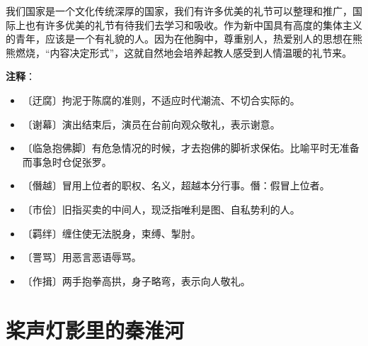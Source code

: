 \documentclass[12pt,UTF-8,openany]{ctexbook}
\begin{document}
\begin{normalsize}
    我们国家是一个文化传统深厚的国家，我们有许多优美的礼节可以整理和推广，国际上也有许多优美的礼节有待我们去学习和吸收。作为新中国具有高度的集体主义的青年，应该是一个有礼貌的人。因为在他胸中，尊重别人，热爱别人的思想在熊熊燃烧，“内容决定形式”，这就自然地会培养起教人感受到人情温暖的礼节来。
    
\end{normalsize}


\newpage

\textbf{注释}：

\vspace{-1em}

\begin{itemize}
    \setlength\itemsep{-0.2em}
    \item 〔迂腐〕拘泥于陈腐的准则，不适应时代潮流、不切合实际的。
    \item 〔谢幕〕演出结束后，演员在台前向观众敬礼，表示谢意。
    \item 〔临急抱佛脚〕有危急情况的时候，才去抱佛的脚祈求保佑。比喻平时无准备而事急时仓促张罗。
    \item 〔僭越〕冒用上位者的职权、名义，超越本分行事。僭：假冒上位者。
    \item 〔市侩〕旧指买卖的中间人，现泛指唯利是图、自私势利的人。
    \item 〔羁绊〕缠住使无法脱身，束缚、掣肘。
    \item 〔詈骂〕用恶言恶语辱骂。
    \item 〔作揖〕两手抱拳高拱，身子略弯，表示向人敬礼。
\end{itemize}

\chapter{桨声灯影里的秦淮河}
\end{document}

